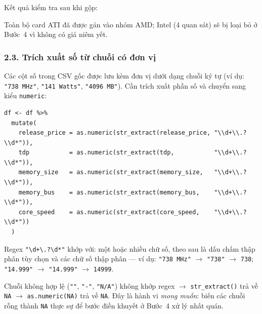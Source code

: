 \documentclass[a4paper]{article}
\begin{document}
Kết quả kiểm tra sau khi gộp:

Toàn bộ card ATI đã được gán vào nhóm AMD; Intel (4 quan sát) sẽ bị loại bỏ ở Bước~4 vì không có giá niêm yết.

\subsubsection*{2.3. Trích xuất số từ chuỗi có đơn vị}

Các cột số trong CSV gốc được lưu kèm đơn vị dưới dạng chuỗi ký tự (ví dụ: \texttt{"738 MHz"}, \texttt{"141 Watts"}, \texttt{"4096 MB"}). Cần trích xuất phần số và chuyển sang kiểu \texttt{numeric}:

\begin{verbatim}
df <- df %>%
  mutate(
    release_price = as.numeric(str_extract(release_price, "\\d+\\.?\\d*")),
    tdp           = as.numeric(str_extract(tdp,           "\\d+\\.?\\d*")),
    memory_size   = as.numeric(str_extract(memory_size,   "\\d+\\.?\\d*")),
    memory_bus    = as.numeric(str_extract(memory_bus,    "\\d+\\.?\\d*")),
    core_speed    = as.numeric(str_extract(core_speed,    "\\d+\\.?\\d*"))
  )
\end{verbatim}

Regex \texttt{"{\textbackslash}d+{\textbackslash}.?{\textbackslash}d*"} khớp với: một hoặc nhiều chữ số, theo sau là dấu chấm thập phân tùy chọn và các chữ số thập phân --- ví dụ: \texttt{"738 MHz"} $\to$ \texttt{"738"} $\to$ \texttt{738}; \texttt{"14.999"} $\to$ \texttt{"14.999"} $\to$ \texttt{14999}.

Chuỗi không hợp lệ (\texttt{""}, \texttt{"-"}, \texttt{"N/A"}) không khớp regex $\to$ \texttt{str\_extract()} trả về \texttt{NA} $\to$ \texttt{as.numeric(NA)} trả về \texttt{NA}. Đây là hành vi \textit{mong muốn}: biến các chuỗi rỗng thành \texttt{NA} thực sự để bước điền khuyết ở Bước~4 xử lý nhất quán.
\end{document}
